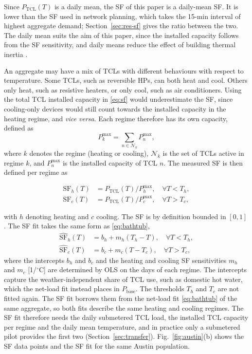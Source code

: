 Since $P_{\mathrm{TCL}}(T)$ is a daily mean, the SF of this paper is a daily-mean SF. It is lower than the SF used in network planning, which takes the 15-min interval of highest aggregate demand; Section~\ref{sec:res-sf} gives the ratio between the two. The daily mean suits the aim of this paper, since the installed capacity follows from the SF sensitivity, and daily means reduce the effect of building thermal inertia \cite{Per17b}.

An aggregate may have a mix of TCLs with different behaviours with respect to temperature. Some TCLs, such as reversible HPs, can both heat and cool. Others only heat, such as resistive heaters, or only cool, such as air conditioners. Using the total TCL installed capacity in \eqref{eq:sf} would underestimate the SF, since cooling-only devices would still count towards the installed capacity in the heating regime, and \emph{vice versa}. Each regime therefore has its own capacity, defined as
\begin{equation}
    P_k^{\max} = \sum_{n\in \mathcal{N}_k}P_n^{\max},
\label{eq:pk}
\end{equation}
where $k$ denotes the regime (heating or cooling), $\mathcal{N}_k$ is the set of TCLs active in regime $k$, and $P_n^{\max}$ is the installed capacity of TCL $n$. The measured SF is then defined per regime as

\begin{equation}
\begin{aligned}
    \mathrm{SF}_h(T) &= {P_{\mathrm{TCL}}(T)}/{P_h^{\max}}, \quad \forall  T < T_h,\\
    \mathrm{SF}_c(T) &= {P_{\mathrm{TCL}}(T)}/{P_c^{\max}}, \quad \forall T > T_c,
\end{aligned}
\label{eq:sf-piecewise}
\end{equation}

with $h$ denoting heating and $c$ cooling. The SF is by definition bounded in $[0,1]$. The SF fit takes the same form as \eqref{eq:bathtub},
\begin{equation}
\begin{aligned}
    \hat{\mathrm{SF}}_h(T) &= b_h + m_h (T_h - T), \quad \forall T < T_h,\\
    \hat{\mathrm{SF}}_c(T) &= b_c + m_c ( T - T_c), \quad \forall T > T_c,
\end{aligned}
\label{eq:sffit}
\end{equation}
where the intercepts $b_h$ and $b_c$ and the heating and cooling SF sensitivities $m_h$ and $m_c$ [1/$^\circ$C] are determined by OLS on the days of each regime. The intercepts capture the weather-independent share of TCL use, such as domestic hot water, which the net-load fit instead places in $P_{\mathrm{base}}$. The thresholds $T_h$ and $T_c$ are not fitted again. The SF fit borrows them from the net-load fit \eqref{eq:bathtub} of the same aggregate, so both fits describe the same heating and cooling regimes. The SF fit therefore needs the daily submetered TCL load, the installed TCL capacity per regime and the daily mean temperature, and in practice only a submetered pilot provides the first two (Section~\ref{sec:transfer}). Fig.~\ref{fig:austin}(b) shows the SF data points and the SF fit for the same Austin population.

